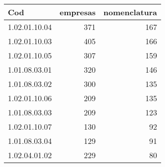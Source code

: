 \begin{table}[ht]
\centering
\begin{tabular}{lrr}
  \hline
Cod & empresas & nomenclatura \\ 
  \hline
1.02.01.10.04 & 371 & 167 \\ 
  1.02.01.10.03 & 405 & 166 \\ 
  1.02.01.10.05 & 307 & 159 \\ 
  1.01.08.03.01 & 320 & 146 \\ 
  1.01.08.03.02 & 300 & 135 \\ 
  1.02.01.10.06 & 209 & 135 \\ 
  1.01.08.03.03 & 209 & 123 \\ 
  1.02.01.10.07 & 130 &  92 \\ 
  1.01.08.03.04 & 129 &  91 \\ 
  1.02.04.01.02 & 229 &  80 \\ 
   \hline
\end{tabular}
\end{table}

